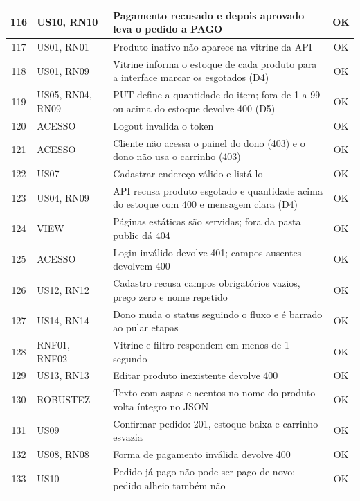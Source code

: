 \begin{longtable}{|c|p{2.5cm}|p{8.4cm}|c|}
116 & US10, RN10 & Pagamento recusado e depois aprovado leva o pedido a PAGO & \cellcolor{green!20}OK \\ \hline
117 & US01, RN01 & Produto inativo não aparece na vitrine da API & \cellcolor{green!20}OK \\ \hline
118 & US01, RN09 & Vitrine informa o estoque de cada produto para a interface marcar os esgotados (D4) & \cellcolor{green!20}OK \\ \hline
119 & US05, RN04, RN09 & PUT define a quantidade do item; fora de 1 a 99 ou acima do estoque devolve 400 (D5) & \cellcolor{green!20}OK \\ \hline
120 & ACESSO & Logout invalida o token & \cellcolor{green!20}OK \\ \hline
121 & ACESSO & Cliente não acessa o painel do dono (403) e o dono não usa o carrinho (403) & \cellcolor{green!20}OK \\ \hline
122 & US07 & Cadastrar endereço válido e listá-lo & \cellcolor{green!20}OK \\ \hline
123 & US04, RN09 & API recusa produto esgotado e quantidade acima do estoque com 400 e mensagem clara (D4) & \cellcolor{green!20}OK \\ \hline
124 & VIEW & Páginas estáticas são servidas; fora da pasta public dá 404 & \cellcolor{green!20}OK \\ \hline
125 & ACESSO & Login inválido devolve 401; campos ausentes devolvem 400 & \cellcolor{green!20}OK \\ \hline
126 & US12, RN12 & Cadastro recusa campos obrigatórios vazios, preço zero e nome repetido & \cellcolor{green!20}OK \\ \hline
127 & US14, RN14 & Dono muda o status seguindo o fluxo e é barrado ao pular etapas & \cellcolor{green!20}OK \\ \hline
128 & RNF01, RNF02 & Vitrine e filtro respondem em menos de 1 segundo & \cellcolor{green!20}OK \\ \hline
129 & US13, RN13 & Editar produto inexistente devolve 400 & \cellcolor{green!20}OK \\ \hline
130 & ROBUSTEZ & Texto com aspas e acentos no nome do produto volta íntegro no JSON & \cellcolor{green!20}OK \\ \hline
131 & US09 & Confirmar pedido: 201, estoque baixa e carrinho esvazia & \cellcolor{green!20}OK \\ \hline
132 & US08, RN08 & Forma de pagamento inválida devolve 400 & \cellcolor{green!20}OK \\ \hline
133 & US10 & Pedido já pago não pode ser pago de novo; pedido alheio também não & \cellcolor{green!20}OK \\ \hline

\end{longtable}
